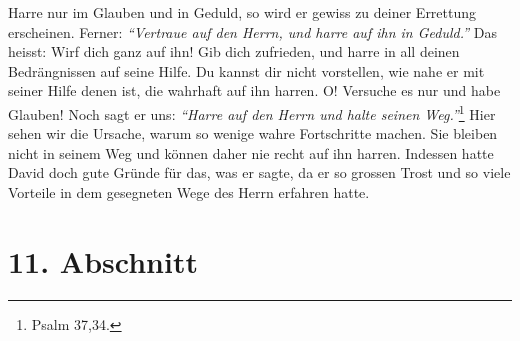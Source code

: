 Harre nur im Glauben und in Geduld, so wird er gewiss zu deiner Errettung
erscheinen. Ferner:
\textit{"`Vertraue auf den Herrn, und harre auf ihn in Geduld."'} Das
heisst: Wirf dich ganz auf ihn! Gib dich zufrieden, und harre in all deinen
Bedrängnissen auf seine Hilfe. Du kannst dir nicht vorstellen, wie nahe er mit
seiner Hilfe denen ist, die wahrhaft auf ihn harren. O! Versuche es nur und habe
Glauben! Noch sagt er uns:
\textit{"`Harre auf den Herrn und halte seinen Weg."'}\footnote{Psalm 37,34.}
Hier sehen wir die Ursache, warum so wenige wahre
Fortschritte machen. Sie bleiben nicht in seinem Weg und können daher nie
recht auf ihn harren. Indessen hatte David doch gute Gründe für das, was er
sagte, da er so grossen Trost und so viele Vorteile in dem gesegneten Wege des
Herrn erfahren hatte.

\section{11. Abschnitt} \label{kap6_ab11}

